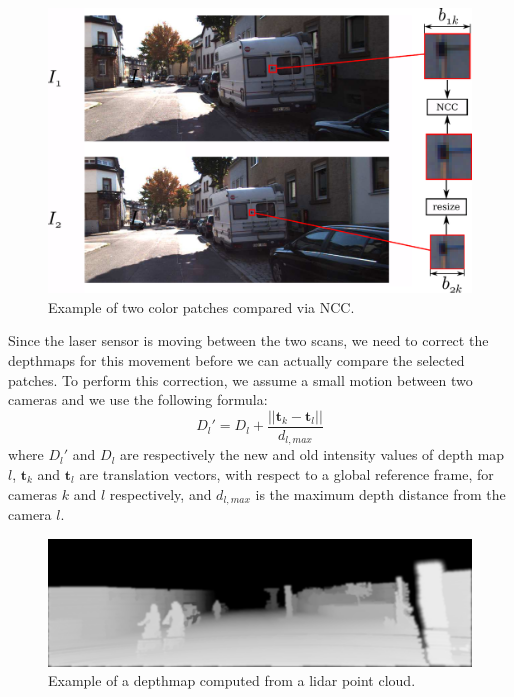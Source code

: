 \begin{figure}[t]
\centering
\includegraphics[width=0.98\columnwidth]{./img/ch-laser/ncc}
\caption{Example of two color patches compared via NCC.}
\label{fig:ncc}
\end{figure}

Since the laser sensor is moving between the two scans, we need to correct the depthmaps for this movement before we can actually compare the selected patches.
To perform this correction, we assume a small motion between two cameras and we use the following formula:
\begin{equation}
D_l' = D_l + \frac{||\mathbf{t}_k - \mathbf{t}_l||}{d_{l,max}}
\end{equation}
where $D_l'$ and $D_l$ are respectively the new and old intensity values of depth map $l$, $\mathbf{t}_k$ and $\mathbf{t}_l$ are translation vectors, with respect to a global reference frame, for cameras $k$ and $l$ respectively, and $d_{l,max}$ is the maximum depth distance from the camera $l$.

\begin{figure}[t]
\centering
\includegraphics[width=0.98\columnwidth]{./img/ch-laser/depth-0129}
\caption{Example of a depthmap computed from a lidar point cloud.}
\label{fig:depth-map}
\end{figure}

